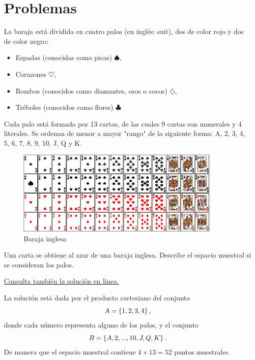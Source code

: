 
\section*{Problemas}

La baraja está dividida en cuatro palos (en inglés: suit), dos de color rojo y dos de color negro:
\begin{itemize}
	\item Espadas (conocidas como picas) $\spadesuit$,
	\item Corazones $\heartsuit$,
	\item Rombos (conocidos como diamantes, oros o cocos) $ \diamondsuit$,
	\item Tréboles (conocidos como flores) $\clubsuit$
\end{itemize}

Cada palo está formado por 13 cartas, de las cuales 9 cartas son numerales y 4 literales. Se ordenan de menor a mayor "rango" de la siguiente forma: A, 2, 3, 4, 5, 6, 7, 8, 9, 10, J, Q y K.

\begin{figure}
	\centering
	\includegraphics[width=10cm]{./pe/deck.jpg}
	\caption{Baraja inglesa}
	\label{fig:deck}
\end{figure}



\begin{problema}
	\label{problema:2.1}
	Una carta se obtiene al azar de una baraja inglesa. Describe el espacio muestral si se consideran los palos.
\end{problema}

\begin{solucion}\label{solucion:2.1}
	
	\href{https://youtu.be/4LdLWpQIcBQ}{Consulta también la solución en línea.}
	
	
	La solución está dada por el producto cartesiano del conjunto \[ A = \left\{ 1,2,3,4 \right\}, \] donde cada número representa alguno de los palos, y el conjunto \[ B = \left\{ A,2,...,10,J,Q,K \right\}.\] De manera que el espacio muestral contiene $ 4\times 13=52 $ puntos muestrales. 	
\end{solucion}


